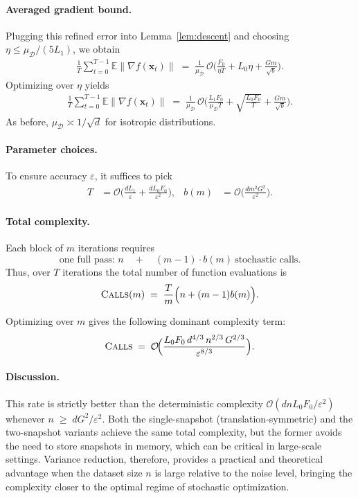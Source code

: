\documentclass[twoside]{article}
\theoremstyle{plain}
\theoremstyle{definition}
\theoremstyle{remark}
\def\cO{{\mathcal{O}}}
\def\vx{{\bm{x}}}
\def\O{{\mathcal{O}}}
\newcommand{\E}{\mathbb{E}}
\begin{document}
\paragraph{Averaged gradient bound.}
Plugging this refined error into Lemma~\ref{lem:descent} and choosing
$\eta\leq \mu_{\mathcal{D}}/(5L_1)$, we obtain
\begin{align}
    \frac{1}{T}\sum_{t=0}^{T-1}\E\|\nabla f(\vx_t)\|
    \;=\; \frac{1}{\mu_{\mathcal{D}}}\,
    \O\!\Big(
        \frac{F_0}{\eta T}
        + L_0\eta
        + \frac{G m}{\sqrt{ b}}
    \Big).
\end{align}
Optimizing over $\eta$ yields
\begin{align}
    \frac{1}{T}\sum_{t=0}^{T-1}\E\|\nabla f(\vx_t)\|
    \;=\; \frac{1}{\mu_{\mathcal{D}}}\,
    \O\!\Big(
        \frac{L_1 F_0}{\mu_{\mathcal{D}} T}
        + \sqrt{\frac{L_0 F_0}{T}}
        + \frac{G m}{\sqrt{ b}}
    \Big).
\end{align}
As before, $\mu_{\mathcal{D}}\asymp 1/\sqrt{d}$ for isotropic distributions.

\paragraph{Parameter choices.}
To ensure accuracy $\varepsilon$, it suffices to pick
\begin{align}
    T &= \O\!\Big(\tfrac{dL_1}{\varepsilon}
        + \tfrac{dL_0F_0}{\varepsilon^2}\Big),
    &
    b(m) &= \O\!\Big(\tfrac{ d m^2 G^2}{\varepsilon^2}\Big).
\end{align}

\paragraph{Total complexity.}
Each block of $m$ iterations requires
\[
    \text{one full pass: } n
    \quad+\quad
    (m-1)\cdot b(m) \ \text{stochastic calls}.
\]
Thus, over $T$ iterations the total number of function evaluations is
\[
    \textsc{Calls}(m)
    \;=\; \frac{T}{m}\Big(n + (m-1)b(m)\Big).
\]

Optimizing over $m$ gives the following dominant complexity term:
\begin{equation}
    \textsc{Calls} \;=\;
    \cO\!\Big(
        \frac{L_0F_0\,d^{4/3}\,n^{2/3}\,G^{2/3}}
             {\varepsilon^{8/3}}
    \Big).
\end{equation}

\paragraph{Discussion.}
This rate is strictly better than the deterministic complexity
$\cO(dnL_0F_0/\varepsilon^2)$ whenever
\(
    n \;\geq\; d G^2/\varepsilon^2.
\)
Both the single-snapshot (translation-symmetric) and the two-snapshot variants
achieve the same total complexity, but the former avoids the need to store
snapshots in memory, which can be critical in large-scale settings. Variance
reduction, therefore, provides a practical and theoretical advantage when the
dataset size $n$ is large relative to the noise level, bringing the complexity
closer to the optimal regime of stochastic optimization.
\end{document}
